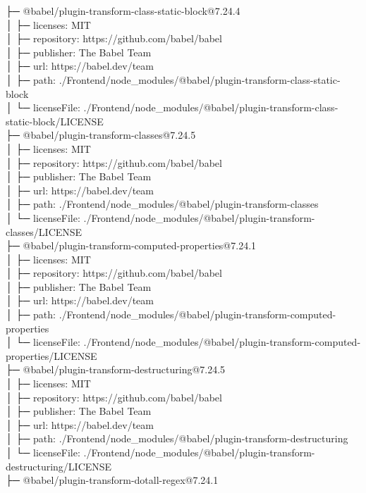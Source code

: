├─ @babel/plugin-transform-class-static-block@7.24.4\\
│  ├─ licenses: MIT\\
│  ├─ repository: https://github.com/babel/babel\\
│  ├─ publisher: The Babel Team\\
│  ├─ url: https://babel.dev/team\\
│  ├─ path: ./Frontend/node\_modules/@babel/plugin-transform-class-static-block\\
│  └─ licenseFile: ./Frontend/node\_modules/@babel/plugin-transform-class-static-block/LICENSE\\
├─ @babel/plugin-transform-classes@7.24.5\\
│  ├─ licenses: MIT\\
│  ├─ repository: https://github.com/babel/babel\\
│  ├─ publisher: The Babel Team\\
│  ├─ url: https://babel.dev/team\\
│  ├─ path: ./Frontend/node\_modules/@babel/plugin-transform-classes\\
│  └─ licenseFile: ./Frontend/node\_modules/@babel/plugin-transform-classes/LICENSE\\
├─ @babel/plugin-transform-computed-properties@7.24.1\\
│  ├─ licenses: MIT\\
│  ├─ repository: https://github.com/babel/babel\\
│  ├─ publisher: The Babel Team\\
│  ├─ url: https://babel.dev/team\\
│  ├─ path: ./Frontend/node\_modules/@babel/plugin-transform-computed-properties\\
│  └─ licenseFile: ./Frontend/node\_modules/@babel/plugin-transform-computed-properties/LICENSE\\
├─ @babel/plugin-transform-destructuring@7.24.5\\
│  ├─ licenses: MIT\\
│  ├─ repository: https://github.com/babel/babel\\
│  ├─ publisher: The Babel Team\\
│  ├─ url: https://babel.dev/team\\
│  ├─ path: ./Frontend/node\_modules/@babel/plugin-transform-destructuring\\
│  └─ licenseFile: ./Frontend/node\_modules/@babel/plugin-transform-destructuring/LICENSE\\
├─ @babel/plugin-transform-dotall-regex@7.24.1\\
